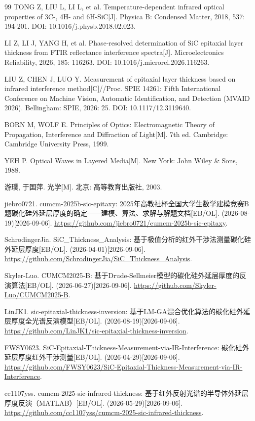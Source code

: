 \documentclass[11pt,a4paper,fontset=fandol]{ctexart}
\begin{document}
\begin{thebibliography}{99}
     TONG Z, LIU L, LI L, et al. Temperature-dependent infrared optical properties of 3C-, 4H- and 6H-SiC[J]. Physica B: Condensed Matter, 2018, 537: 194-201. DOI: 10.1016/j.physb.2018.02.023.

     LI Z, LI J, YANG H, et al. Phase-resolved determination of SiC epitaxial layer thickness from FTIR reflectance interference spectra[J]. Microelectronics Reliability, 2026, 185: 116263. DOI: 10.1016/j.microrel.2026.116263.

     LIU Z, CHEN J, LUO Y. Measurement of epitaxial layer thickness based on infrared interference method[C]//Proc. SPIE 14261: Fifth International Conference on Machine Vision, Automatic Identification, and Detection (MVAID 2026). Bellingham: SPIE, 2026: 25. DOI: 10.1117/12.3119640.

     BORN M, WOLF E. Principles of Optics: Electromagnetic Theory of Propagation, Interference and Diffraction of Light[M]. 7th ed. Cambridge: Cambridge University Press, 1999.

     YEH P. Optical Waves in Layered Media[M]. New York: John Wiley \& Sons, 1988.

     游璞, 于国萍. 光学[M]. 北京: 高等教育出版社, 2003.

     jiebro0721. cumcm-2025b-sic-epitaxy: 2025年高教社杯全国大学生数学建模竞赛B题碳化硅外延层厚度的确定——建模、算法、求解与解题文档[EB/OL]. (2026-08-19)[2026-09-06]. \url{https://github.com/jiebro0721/cumcm-2025b-sic-epitaxy}.

     SchrodingerJia. SiC\_Thickness\_Analysis: 基于极值分析的红外干涉法测量碳化硅外延层厚度[EB/OL]. (2026-04-01)[2026-09-06]. \url{https://github.com/SchrodingerJia/SiC_Thickness_Analysis}.

     Skyler-Luo. CUMCM2025-B: 基于Drude-Sellmeier模型的碳化硅外延层厚度的反演算法[EB/OL]. (2026-06-27)[2026-09-06]. \url{https://github.com/Skyler-Luo/CUMCM2025-B}.

     LinJK1. sic-epitaxial-thickness-inversion: 基于LM-GA混合优化算法的碳化硅外延层厚度全光谱反演模型[EB/OL]. (2026-08-19)[2026-09-06]. \url{https://github.com/LinJK1/sic-epitaxial-thickness-inversion}.

     FWSY0623. SiC-Epitaxial-Thickness-Measurement-via-IR-Interference: 碳化硅外延层厚度红外干涉测量[EB/OL]. (2026-04-29)[2026-09-06]. \url{https://github.com/FWSY0623/SiC-Epitaxial-Thickness-Measurement-via-IR-Interference}.

     cc1107yss. cumcm-2025-sic-infrared-thickness: 基于红外反射光谱的半导体外延层厚度反演（MATLAB）[EB/OL]. (2026-05-29)[2026-09-06]. \url{https://github.com/cc1107yss/cumcm-2025-sic-infrared-thickness}.

\end{thebibliography}
\end{document}
